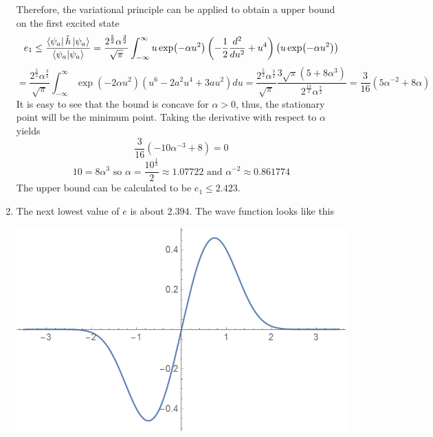 \begin{sol}
\begin{enumerate}[label=\textbf{(\alph*)}]
\begin{equation}
\end{equation}
Therefore, the variational principle can be applied to obtain a upper bound on the first excited state
\begin{equation}
	e_1\leq\frac{\bra{\psi_a}\hat h\ket{\psi_a}}{\braket{\psi_a}{\psi_a}}=\frac{2^\frac{5}{2}\alpha^\frac{3}{2}}{\sqrt\pi}\int_{-\infty}^\infty u\exp(-\alpha u^2)\left(-\frac{1}{2}\frac{d^2}{du^2}+u^4\right)\left(u\exp(-\alpha u^2)\right)
\end{equation}  
\begin{equation}
	=\frac{2^\frac{5}{2}\alpha^\frac{3}{2}}{\sqrt\pi}\int_{-\infty}^\infty \exp(-2\alpha u^2)\left(u^6-2a^2u^4+3au^2\right)du=\frac{2^\frac{5}{2}\alpha^\frac{3}{2}}{\sqrt{\pi}}\frac{3\sqrt{\pi}(5+8\alpha^3)}{2^\frac{13}{2}\alpha^\frac{7}{2}}=\frac{3}{16}(5\alpha^{-2}+8\alpha)
\end{equation} 
It is easy to see that the bound is concave for $\alpha>0$, thus, the stationary point will be the minimum point. Taking the derivative with respect to $\alpha$ yields
\begin{equation}
	\frac{3}{16}(-10\alpha^{-3}+8)=0
\end{equation}
\begin{equation}
	10=8\alpha^3\text{ so }\alpha=\frac{10^{\frac{1}{3}}}{2}\approx 1.07722\text{ and }\alpha^{-2}\approx 0.861774
\end{equation}   
The upper bound can be calculated to be $e_1\leq 2.423$.
\newpage
\item
The next lowest value of $e$ is about $2.394$. The wave function looks like this\\
\begin{center}
\includegraphics[scale=0.4]{P02/HO1.png}
\end{center}
\end{enumerate}
\end{sol}